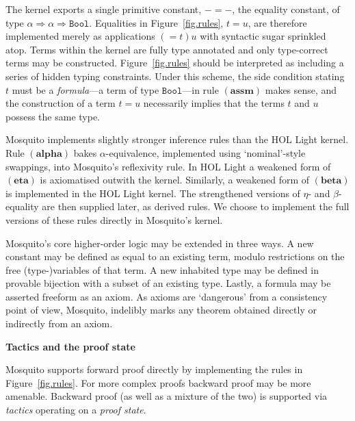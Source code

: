 \documentclass{llncs}
\newcommand{\mosquito}{Mosquito\xspace}
\newcommand{\rulefont}[1]{\ensuremath{(\mathbf{#1})}}
\begin{document}
The kernel exports a single primitive constant, $- = -$, the equality constant, of type $\alpha \Rightarrow \alpha \Rightarrow \mathtt{Bool}$.
Equalities in Figure~\ref{fig.rules}, $t = u$, are therefore implemented merely as applications $(= t) u$ with syntactic sugar sprinkled atop.
Terms within the kernel are fully type annotated and only type-correct terms may be constructed.
Figure~\ref{fig.rules} should be interpreted as including a series of hidden typing constraints.
Under this scheme, the side condition stating $t$ must be a \emph{formula}---a term of type $\mathtt{Bool}$---in rule \rulefont{assm} makes sense, and the construction of a term $t = u$ necessarily implies that the terms $t$ and $u$ possess the same type.

\mosquito implements slightly stronger inference rules than the HOL Light kernel.
Rule \rulefont{alpha} bakes $\alpha$-equivalence, implemented using `nominal'-style swappings, into \mosquito's reflexivity rule.
In HOL Light a weakened form of \rulefont{eta} is axiomatised outwith the kernel.
Similarly, a weakened form of \rulefont{beta} is implemented in the HOL Light kernel.
The strengthened versions of $\eta$- and $\beta$-equality are then supplied later, as derived rules.
We choose to implement the full versions of these rules directly in \mosquito's kernel.

\mosquito's core higher-order logic may be extended in three ways.
A new constant may be defined as equal to an existing term, modulo restrictions on the free (type-)variables of that term.
A new inhabited type may be defined in provable bijection with a subset of an existing type.
Lastly, a formula may be asserted freeform as an axiom.
As axioms are `dangerous' from a consistency point of view, \mosquito, indelibly marks any theorem obtained directly or indirectly from an axiom.

\noindent\newline
\textbf{Tactics and the proof state}
\newline

\mosquito supports forward proof directly by implementing the rules in Figure~\ref{fig.rules}.
For more complex proofs backward proof may be more amenable.
Backward proof (as well as a mixture of the two) is supported via \emph{tactics} operating on a \emph{proof state}.
\end{document}
